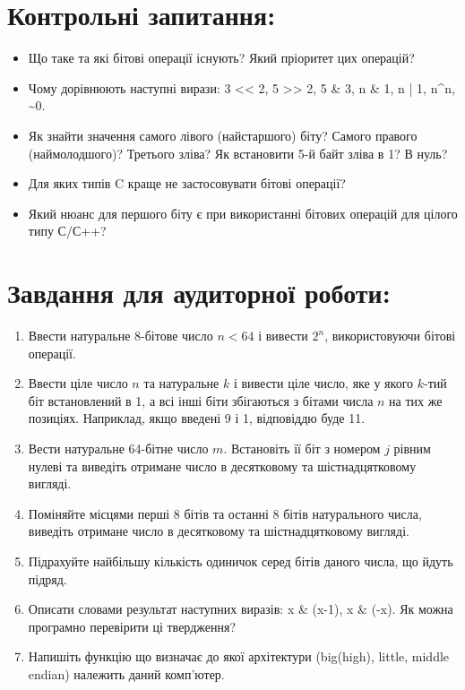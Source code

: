 \documentclass[a5paper,titlepage,openany,twoside,draft]{book_unv}%
\begin{document}
\section{Контрольні запитання:}
\begin{itemize}
\item
  Що таке та які бітові операції існують? Який пріоритет цих операцій?
\item
  Чому дорівнюють наступні вирази:
  3 \textless{}\textless{} 2, 5 \textgreater{}\textgreater{} 2, 5 \& 3, 
n \& 1, n | 1, n\textasciicircum{}n, \textasciitilde{}0.
\item
  Як знайти значення самого лівого (найстаршого) біту? 
Самого правого (наймолодшого)? Третього зліва?
  Як встановити 5-й байт зліва в 1? В нуль?
\item
  Для яких типів C краще не застосовувати бітові операції?
\item
  Який нюанс для першого біту є при використанні бітових операцій для
  цілого типу С/С++?
\end{itemize}

\section{Завдання для аудиторної роботи:}

\begin{enumerate}
\def\labelenumi{\arabic{enumi})}
\item
  Ввести натуральне 8-бітове число $n<64$ і вивести $2^{n}$, використовуючи бітові операції.
\item
  Ввести ціле число $n$ та натуральне $k$ і вивести ціле число, яке у якого
  $k$-тий біт встановлений в 1, а всі інші біти збігаються з бітами числа $n$
  на тих же позиціях. Наприклад, якщо введені 9 і 1, відповіддю буде 11.
\item
  Вести натуральне 64-бітне число $m$. Встановіть її біт
  з номером $j$ рівним нулеві та виведіть отримане число в десятковому та
  шістнадцятковому вигляді.
\item
  Поміняйте місцями перші 8 бітів та останні 8 бітів натурального числа,
  виведіть отримане число в десятковому та шістнадцятковому вигляді.
\item
  Підрахуйте найбільшу кількість одиничок серед бітів даного числа, що
  йдуть підряд.
\item
  Описати словами результат наступних виразів: x \& (x-1), x \& (-x). 
Як можна програмно перевірити ці твердження?
\item
  Напишіть функцію що визначає до якої архітектури (big(high), little, middle
  endian) належить даний комп'ютер.
\end{enumerate}
\end{document}
